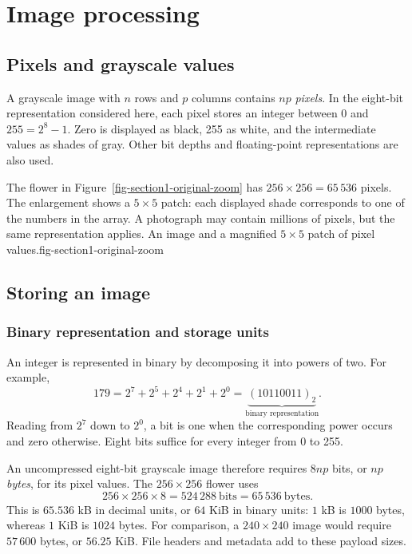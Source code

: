 \chapter{Image processing}
\label{chap-images}

\section{Pixels and grayscale values}
A grayscale image with $n$ rows and $p$ columns contains $np$ \emph{pixels}. In the eight-bit representation considered here, each pixel stores an integer between $0$ and $255=2^8-1$. Zero is displayed as black, 255 as white, and the intermediate values as shades of gray. Other bit depths and floating-point representations are also used.

The flower in Figure~\ref{fig-section1-original-zoom} has $256\times256=65\,536$ pixels. The enlargement shows a $5\times5$ patch: each displayed shade corresponds to one of the numbers in the array. A photograph may contain millions of pixels, but the same representation applies.
{An image and a magnified $5\times5$ patch of pixel values.}{fig-section1-original-zoom}

\section{Storing an image}
\subsection{Binary representation and storage units}
An integer is represented in binary by decomposing it into powers of two. For example,
\[
 179=2^7+2^5+2^4+2^1+2^0
    =\underbrace{(10110011)_2}_{\text{binary representation}}.
\]
Reading from $2^7$ down to $2^0$, a bit is one when the corresponding power occurs and zero otherwise. Eight bits suffice for every integer from 0 to 255.

An uncompressed eight-bit grayscale image therefore requires $8np$ bits, or $np$ \emph{bytes}, for its pixel values. The $256\times256$ flower uses
\[
 256\times256\times8=524\,288\ \text{bits}
       =65\,536\ \text{bytes}.
\]
This is $65.536$ kB in decimal units, or $64$ KiB in binary units: $1$ kB is $1000$ bytes, whereas $1$ KiB is $1024$ bytes. For comparison, a $240\times240$ image would require $57\,600$ bytes, or $56.25$ KiB. File headers and metadata add to these payload sizes.

